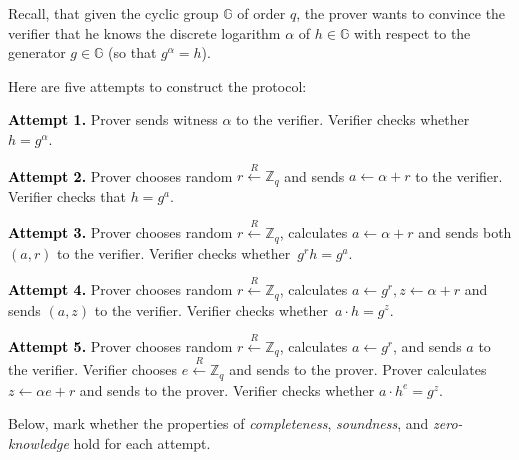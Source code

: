 \documentclass[../lecture-notes-105x135.tex]{subfiles}
\begin{document}
    Recall, that given the cyclic group $\mathbb{G}$ of order $q$, the prover wants to convince the verifier that he knows the discrete logarithm $\alpha$ of $h \in \mathbb{G}$ with respect to the generator $g \in \mathbb{G}$ (so that $g^{\alpha}=h$).

    Here are five attempts to construct the protocol:

    \textcolor{black}{\textbf{Attempt 1.}} Prover sends witness $\alpha$ to the verifier. Verifier checks whether $h = g^{\alpha}$.

    \textcolor{black}{\textbf{Attempt 2.}} Prover chooses random $r \xleftarrow{R} \mathbb{Z}_q$ and sends $a \gets \alpha + r$ to the verifier. Verifier checks that $h = g^a$.

    \textcolor{black}{\textbf{Attempt 3.}} Prover chooses random $r \xleftarrow{R} \mathbb{Z}_q$, calculates $a \gets \alpha + r$ and sends both $(a,r)$ to the verifier. Verifier checks whether~$g^r h = g^a$.

    \textcolor{black}{\textbf{Attempt 4.}} Prover chooses random $r \xleftarrow{R} \mathbb{Z}_q$, calculates $a \gets g^r, z \gets \alpha+r$ and sends $(a,z)$ to the verifier. Verifier checks whether~$a \cdot h = g^z$.

    \textcolor{black}{\textbf{Attempt 5.}} Prover chooses random $r \xleftarrow{R} \mathbb{Z}_q$, calculates $a \gets g^r$, and sends $a$ to the verifier. Verifier chooses $e \xleftarrow{R} \mathbb{Z}_q$ and sends to the prover. Prover calculates $z \gets \alpha e + r$ and sends to the prover. Verifier checks whether $a \cdot h^e = g^z$.

    Below, mark whether the properties of \textit{completeness}, \textit{soundness}, and \textit{zero-knowledge} hold for each attempt.

    \vspace{-1.5mm}

    \begin{center}
    \end{center}
\end{document}
